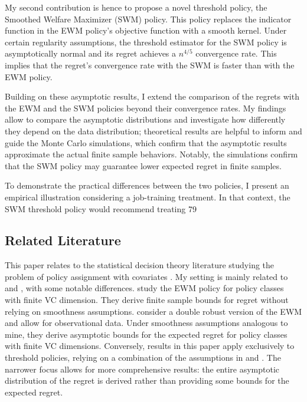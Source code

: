 {My second contribution is hence to propose a novel threshold policy, the Smoothed Welfare Maximizer (SWM) policy. This policy replaces the indicator function in the EWM policy's objective function with a smooth kernel. Under certain regularity assumptions, the threshold estimator for the SWM policy is asymptotically normal and its regret achieves a $n^{4/5}$ convergence rate. This implies that the regret's convergence rate with the SWM is faster than with the EWM policy.

Building on these asymptotic results, I extend the comparison of the regrets with the EWM and the SWM policies beyond their convergence rates. My findings allow to compare the asymptotic distributions and investigate how differently they depend on the data distribution; theoretical results are helpful to inform and guide the Monte Carlo simulations, which confirm that the asymptotic results approximate the actual finite sample behaviors. Notably, the simulations confirm that the SWM policy may guarantee lower expected regret in finite samples.

To demonstrate the practical differences between the two policies, I present an empirical illustration considering a job-training treatment. In that context, the SWM threshold policy would recommend treating 79\
\subsection{Related Literature}

This paper relates to the statistical decision theory literature studying the problem of policy assignment with covariates \citep{manski2004statistical,stoye2012minimax,kitagawa2018should,athey2021policy,mbakop2021model,sun2021treatment,sun2021empirical,viviano2023fair}. My setting is mainly related to \cite{kitagawa2018should} and \cite{athey2021policy}, with some notable differences. \cite{kitagawa2018should} study the EWM policy for policy classes with finite VC dimension. They derive finite sample bounds for regret without relying on smoothness assumptions. \cite{athey2021policy} consider a double robust version of the EWM and allow for observational data. Under smoothness assumptions analogous to mine, they derive asymptotic bounds for the expected regret for policy classes with finite VC dimensions. Conversely, results in this paper apply exclusively to threshold policies, relying on a combination of the assumptions in \cite{kitagawa2018should} and \cite{athey2021policy}. The narrower focus allows for more comprehensive results: the entire asymptotic distribution of the regret is derived rather than providing some bounds for the expected regret.

}
